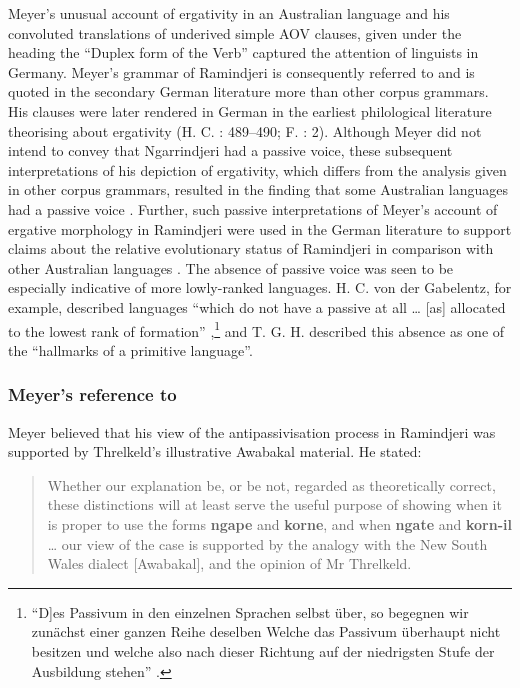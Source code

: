 Meyer’s unusual account of ergativity in an Australian language and his convoluted translations of underived simple AOV clauses, given under the heading the “Duplex form of the Verb” \citeyearpar[38--42]{meyer_vocabulary_1843} captured the attention of linguists in Germany. Meyer’s grammar of Ramindjeri is consequently referred to and is quoted in the secondary German literature more than other corpus grammars. His clauses were later rendered in German in the earliest philological literature theorising about ergativity (H. C. \citealt{gabelentz_uber_1861}: 489--490; F. \citealt{muller_grundris_1882}: 2). Although Meyer did not intend to convey that Ngarrindjeri had a passive voice, these subsequent interpretations of his depiction of ergativity, which differs from the analysis given in other corpus grammars, resulted in the finding that some Australian languages had a passive voice \citep{StocktingForthcomingPascaleJeanMichel}. Further, such passive interpretations of Meyer’s account of ergative morphology in Ramindjeri were used in the German literature to support claims about the relative evolutionary status of Ramindjeri in comparison with other Australian languages \citep[55]{Stockigtinpress}. The absence of passive voice was seen to be especially indicative of more lowly-ranked languages. H. C. von der Gabelentz, for example, described languages “which do not have a passive at all … [as] allocated to the lowest rank of formation'' \citeyearpar[464]{gabelentz_uber_1861},\footnote{``D]es Passivum in den einzelnen Sprachen selbst über, so begegnen wir zunächst einer ganzen Reihe deselben Welche das Passivum überhaupt nicht besitzen und welche also nach dieser Richtung auf der niedrigsten Stufe der Ausbildung stehen'' \citep[464]{gabelentz_uber_1861}.}\textsuperscript{} and T. G. H. \citet[112]{strehlow_aranda_1944} described this absence as one of the “hallmarks of a primitive language''.

\subsubsection{Meyer’s reference to \citet{Threlkeld1834}}
\label{sec:key:6.1.2.8}

Meyer believed that his view of the antipassivisation process in Ramindjeri was supported by Threlkeld’s illustrative Awabakal material. He stated:

\begin{quote}
Whether our explanation be, or be not, regarded as theoretically correct, these distinctions will at least serve the useful purpose of showing when it is proper to use the forms \textbf{ngape} and \textbf{korne}, and when \textbf{ngate} and \textbf{korn-il} … our view of the case is supported by the analogy with the New South Wales dialect [Awabakal], and the opinion of Mr Threlkeld. \citep[4]{meyer_vocabulary_1843}
\end{quote}

